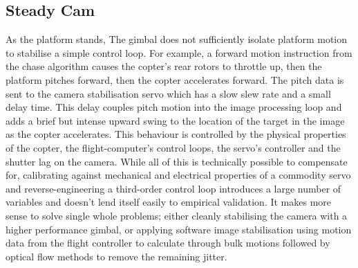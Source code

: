 \documentclass[11pt]{article}
\begin{document}
    \subsection{Steady Cam}
      As the platform stands, The gimbal does not sufficiently isolate platform motion to stabilise a simple control loop.
      For example, a forward motion instruction from the chase algorithm causes the copter's rear rotors to throttle up, then the platform pitches forward, then the copter accelerates forward.  The pitch data is sent to the camera stabilisation servo which has a slow slew rate and a small delay time.  This delay couples pitch motion into the image processing loop and adds a brief but intense upward swing to the location of the target in the image as the copter accelerates.
      This behaviour is controlled by the physical properties of the copter, the flight-computer's control loops, the servo's controller and the shutter lag on the camera. While all of this is technically possible to compensate for, calibrating against mechanical and electrical properties of a commodity servo and reverse-engineering a third-order control loop introduces a large number of variables and doesn't lend itself easily to empirical validation.
      It makes more sense to solve single whole problems; either cleanly stabilising the camera with a higher performance gimbal, or applying software image stabilisation using motion data from the flight controller to calculate through bulk motions followed by optical flow methods to remove the remaining jitter.

    










	
\end{document}
